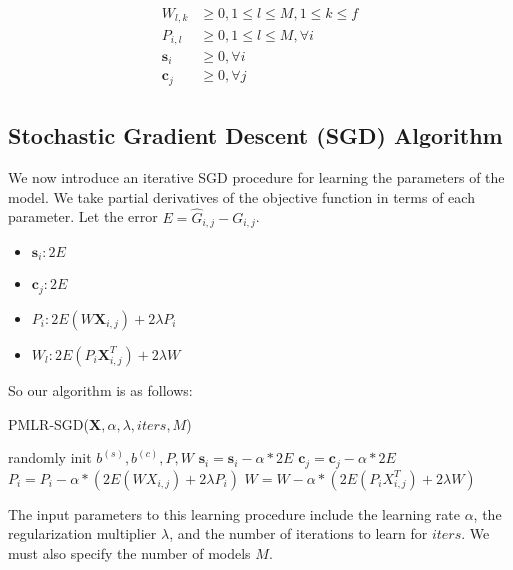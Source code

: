 \documentclass[10pt]{proc}
\begin{document}
\begin{align}
  \begin{split}
    W_{l,k}  &\ge 0, 1 \le l \le M, 1 \le k \le f  \\
    P_{i,l}  &\ge 0, 1 \le l \le M, \forall i      \\
    \bm{s}_i &\ge 0, \forall i                    \\
    \bm{c}_j &\ge 0, \forall j
  \end{split}
\end{align}

\subsection{Stochastic Gradient Descent (SGD) Algorithm}

We now introduce an iterative SGD procedure for learning the parameters of the
model. We take partial derivatives of the objective function in terms of each
parameter. Let the error $E = \hat{G}_{i,j} - G_{i,j}$.

\begin{itemize}
  \item  $\bm{s}_i: 2E$
  \item  $\bm{c}_j: 2E$
  \item  $P_i: 2E(W \bm{X}_{i,j}) + 2\lambda P_i$
  \item  $W_l: 2E(P_i \bm{X}_{i,j}^T) + 2\lambda W$
\end{itemize}

So our algorithm is as follows:

\begin{algorithm}
  \caption{PMLR-SGD($\bm{X}, \alpha, \lambda, iters, M$) }
  \begin{algorithmic}[1]
    \State randomly init {$b^{(s)}, b^{(c)}, P, W$}
            \State $\bm{s}_i = \bm{s}_i - \alpha * 2E$
            \State $\bm{c}_j = \bm{c}_j - \alpha * 2E$
            \State $P_i = P_i - \alpha * (2E(W X_{i,j}) + 2\lambda P_i)$
            \State $W = W - \alpha * (2E(P_i X_{i,j}^T) + 2\lambda W)$
        \EndFor
    \EndFor
  \end{algorithmic}
\end{algorithm}

The input parameters to this learning procedure include the learning rate
$\alpha$, the regularization multiplier $\lambda$, and the number of iterations
to learn for $iters$. We must also specify the number of models $M$.
\end{document}

